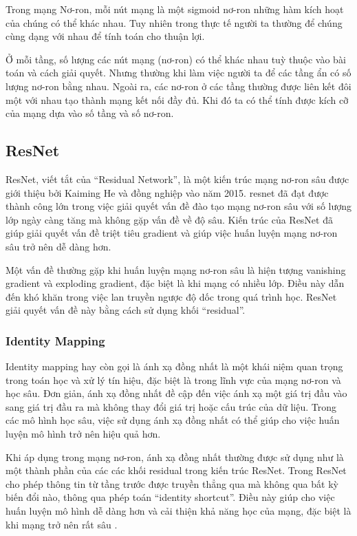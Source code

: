 Trong mạng Nơ-ron, mỗi nút mạng là một sigmoid nơ-ron những hàm kích hoạt của chúng có thể khác nhau. Tuy nhiên trong thực tế người ta thường để chúng cùng dạng với nhau để tính toán cho thuận lợi.

Ở mỗi tầng, số lượng các nút mạng (nơ-ron) có thể khác nhau tuỳ thuộc vào bài toán và cách giải quyết. Nhưng thường khi làm việc người ta để các tầng ẩn có số lượng nơ-ron bằng nhau. Ngoài ra, các nơ-ron ở các tầng thường được liên kết đôi một với nhau tạo thành mạng kết nối đầy đủ. Khi đó ta có thể tính được kích cỡ của mạng dựa vào số tầng và số nơ-ron.

\subsection{ResNet}
ResNet, viết tắt của ``Residual Network'', là một kiến trúc mạng nơ-ron sâu được giới thiệu bởi Kaiming He và đồng nghiệp vào năm 2015. \acrshort*{resnet} đã đạt được thành công lớn trong việc giải quyết vấn đề đào tạo mạng nơ-ron sâu với số lượng lớp ngày càng tăng mà không gặp vấn đề về độ sâu. Kiến trúc của ResNet đã giúp giải quyết vấn đề triệt tiêu gradient và giúp việc huấn luyện mạng nơ-ron sâu trở nên dễ dàng hơn.

Một vấn đề thường gặp khi huấn luyện mạng nơ-ron sâu là hiện tượng vanishing gradient và exploding gradient, đặc biệt là khi mạng có nhiều lớp. Điều này dẫn đến khó khăn trong việc lan truyền ngược độ dốc trong quá trình học. ResNet giải quyết vấn đề này bằng cách sử dụng khối ``residual''.

\subsubsection*{Identity Mapping}
Identity mapping hay còn gọi là ánh xạ đồng nhất là một khái niệm quan trọng trong toán học và xử lý tín hiệu, đặc biệt là trong lĩnh vực của mạng nơ-ron và học sâu. Đơn giản, ánh xạ đồng nhất đề cập đến việc ánh xạ một giá trị đầu vào sang giá trị đầu ra mà không thay đổi giá trị hoặc cấu trúc của dữ liệu. Trong các mô hình học sâu, việc sử dụng ánh xạ đồng nhất có thể giúp cho việc huấn luyện mô hình trở nên hiệu quả hơn.

Khi áp dụng trong mạng nơ-ron, ánh xạ đồng nhất thường được sử dụng như là một thành phần của các các khối residual trong kiến trúc ResNet. Trong ResNet cho phép thông tin từ tầng trước được truyền thẳng qua mà không qua bất kỳ biến đổi nào, thông qua phép toán ``identity shortcut''. Điều này giúp cho việc huấn luyện mô hình dễ dàng hơn và cải thiện khả năng học của mạng, đặc biệt là khi mạng trở nên rất sâu \cite{he2016identity}.

